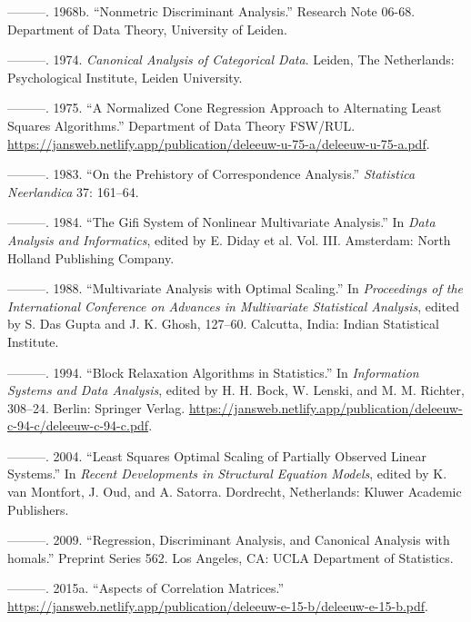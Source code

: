 \documentclass[
  12pt,
  letterpaper,
]{scrbook}
\newlength{\cslhangindent}
\newenvironment{CSLReferences}[2] %
 {\begin{list}{}{%
  \setlength{\itemindent}{0pt}
  \setlength{\leftmargin}{0pt}
  \setlength{\parsep}{0pt}
  \ifodd #1
   \setlength{\leftmargin}{\cslhangindent}
   \setlength{\itemindent}{-1\cslhangindent}
  \fi
  \setlength{\itemsep}{#2\baselineskip}}}
 {\end{list}}
\begin{document}
\begin{CSLReferences}{1}{0}
---------. 1968b. {``Nonmetric Discriminant Analysis.''} Research Note
06-68. Department of Data Theory, University of Leiden.

---------. 1974. \emph{Canonical Analysis of Categorical Data}. Leiden,
The Netherlands: Psychological Institute, Leiden University.

---------. 1975. {``{A Normalized Cone Regression Approach to
Alternating Least Squares Algorithms}.''} Department of Data Theory
FSW/RUL.
\url{https://jansweb.netlify.app/publication/deleeuw-u-75-a/deleeuw-u-75-a.pdf}.

---------. 1983. {``On the Prehistory of Correspondence Analysis.''}
\emph{Statistica Neerlandica} 37: 161--64.

---------. 1984. {``The Gifi System of Nonlinear Multivariate
Analysis.''} In \emph{Data Analysis and Informatics}, edited by E. Diday
et al. Vol. III. Amsterdam: North Holland Publishing Company.

---------. 1988. {``{Multivariate Analysis with Optimal Scaling}.''} In
\emph{Proceedings of the International Conference on Advances in
Multivariate Statistical Analysis}, edited by S. Das Gupta and J. K.
Ghosh, 127--60. Calcutta, India: Indian Statistical Institute.

---------. 1994. {``{Block Relaxation Algorithms in Statistics}.''} In
\emph{Information Systems and Data Analysis}, edited by H. H. Bock, W.
Lenski, and M. M. Richter, 308--24. Berlin: Springer Verlag.
\url{https://jansweb.netlify.app/publication/deleeuw-c-94-c/deleeuw-c-94-c.pdf}.

---------. 2004. {``Least Squares Optimal Scaling of Partially Observed
Linear Systems.''} In \emph{Recent Developments in Structural Equation
Models}, edited by K. van Montfort, J. Oud, and A. Satorra. Dordrecht,
Netherlands: Kluwer Academic Publishers.

---------. 2009. {``{Regression, Discriminant Analysis, and Canonical
Analysis with homals}.''} Preprint Series 562. Los Angeles, CA: UCLA
Department of Statistics.

---------. 2015a. {``{Aspects of Correlation Matrices}.''}
\url{https://jansweb.netlify.app/publication/deleeuw-e-15-b/deleeuw-e-15-b.pdf}.


\end{CSLReferences}
\end{document}
